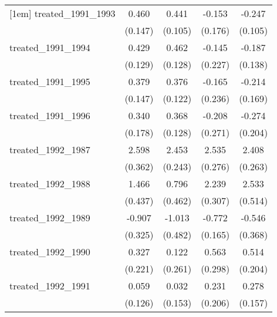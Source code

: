 {\begin{tabular}{l*{4}{c}}
[1em]
treated\_1991\_1993&       0.460\sym{**} &       0.441\sym{***}&      -0.153         &      -0.247\sym{*}  \\
            &     (0.147)         &     (0.105)         &     (0.176)         &     (0.105)         \\
[1em]
treated\_1991\_1994&       0.429\sym{***}&       0.462\sym{***}&      -0.145         &      -0.187         \\
            &     (0.129)         &     (0.128)         &     (0.227)         &     (0.138)         \\
[1em]
treated\_1991\_1995&       0.379\sym{*}  &       0.376\sym{**} &      -0.165         &      -0.214         \\
            &     (0.147)         &     (0.122)         &     (0.236)         &     (0.169)         \\
[1em]
treated\_1991\_1996&       0.340         &       0.368\sym{**} &      -0.208         &      -0.274         \\
            &     (0.178)         &     (0.128)         &     (0.271)         &     (0.204)         \\
[1em]
treated\_1992\_1987&       2.598\sym{***}&       2.453\sym{***}&       2.535\sym{***}&       2.408\sym{***}\\
            &     (0.362)         &     (0.243)         &     (0.276)         &     (0.263)         \\
[1em]
treated\_1992\_1988&       1.466\sym{***}&       0.796         &       2.239\sym{***}&       2.533\sym{***}\\
            &     (0.437)         &     (0.462)         &     (0.307)         &     (0.514)         \\
[1em]
treated\_1992\_1989&      -0.907\sym{**} &      -1.013\sym{*}  &      -0.772\sym{***}&      -0.546         \\
            &     (0.325)         &     (0.482)         &     (0.165)         &     (0.368)         \\
[1em]
treated\_1992\_1990&       0.327         &       0.122         &       0.563         &       0.514\sym{*}  \\
            &     (0.221)         &     (0.261)         &     (0.298)         &     (0.204)         \\
[1em]
treated\_1992\_1991&       0.059         &       0.032         &       0.231         &       0.278         \\
            &     (0.126)         &     (0.153)         &     (0.206)         &     (0.157)         \\

\end{tabular}}
